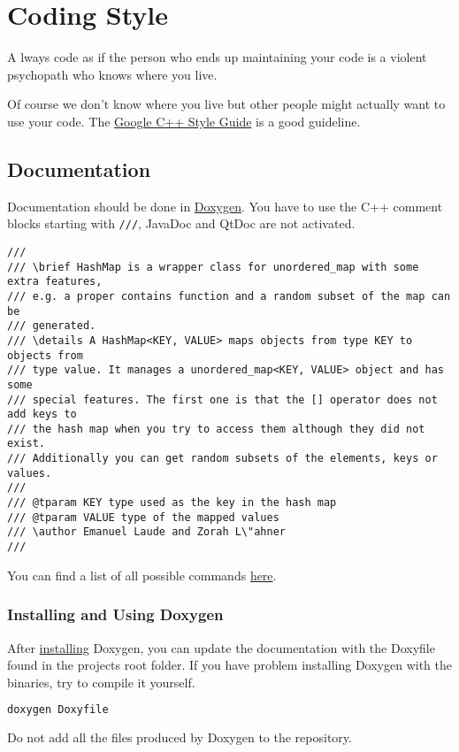 
\chapter{Coding Style}

\begin{mdframed}
\lettrine{A}{} lways code as if the person who ends up maintaining your code is a violent psychopath who knows where you live.
\end{mdframed}

Of course we don't know where you live but other people might actually want to use your code. The \href{http://google-styleguide.googlecode.com/svn/trunk/cppguide.html}{Google C++ Style Guide} is a good guideline. 

\section{Documentation}

Documentation should be done in \href{http://www.stack.nl/~dimitri/doxygen/}{Doxygen}. You have to use the C++ comment blocks starting with \texttt{///}, JavaDoc and QtDoc are not activated. 

\begin{lstlisting}
///
/// \brief HashMap is a wrapper class for unordered_map with some extra features,
/// e.g. a proper contains function and a random subset of the map can be 
/// generated.
/// \details A HashMap<KEY, VALUE> maps objects from type KEY to objects from 
/// type value. It manages a unordered_map<KEY, VALUE> object and has some 
/// special features. The first one is that the [] operator does not add keys to 
/// the hash map when you try to access them although they did not exist. 
/// Additionally you can get random subsets of the elements, keys or values.
///
/// @tparam KEY type used as the key in the hash map
/// @tparam VALUE type of the mapped values
/// \author Emanuel Laude and Zorah L\"ahner
///
\end{lstlisting}

You can find a list of all possible commands \href{http://www.stack.nl/~dimitri/doxygen/manual/commands.html}{here}.

\subsection{Installing and Using Doxygen}

After \href{http://www.stack.nl/~dimitri/doxygen/download.html}{installing} Doxygen, you can update the documentation with the Doxyfile found in the projects root folder. If you have problem installing Doxygen with the binaries, try to compile it yourself. 

\begin{lstlisting}[language=bash, numbers=none]
	doxygen Doxyfile
\end{lstlisting}

\begin{mdframed}
Do not add all the files produced by Doxygen to the repository.
\end{mdframed}